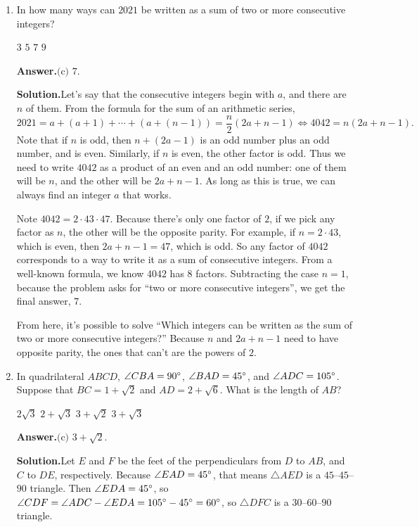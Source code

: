 \documentclass[11pt,paper=letter]{scrartcl}
\newcommand{\ansb}[2]{{\sffamily \bfseries Answer.}\;\(\boxed{\text{(#1) #2}}\).}
\newcommand{\sol}{{\sffamily \bfseries Solution.}\;}
\newenvironment{rem}%
{\noindent \ignorespaces \small \sffamily \sansmath {\bfseries Remark.}}%
{\ignorespacesafterend}
\begin{document}
\begin{enumerate}[align=left,leftmargin=*]
\item In how many ways can $2021$ be written as a sum of two or more consecutive integers?

\fourch
{$3$}
{$5$}
{$7$}
{$9$}

\ansb{c}{$7$}

\sol Let's say that the consecutive integers begin with $a$, and there are $n$ of them. From the formula for the sum of an arithmetic series, \[
  2021 = a + (a + 1) + \cdots + \left(a + (n - 1)\right) = \frac{n}{2}(2a + n - 1) \iff 4042 = n(2a + n - 1).
\]
Note that if $n$ is odd, then $n + (2a - 1)$ is an odd number plus an odd number, and is even. Similarly, if $n$ is even, the other factor is odd. Thus we need to write $4042$ as a product of an even and an odd number: one of them will be $n$, and the other will be $2a + n - 1$. As long as this is true, we can always find an integer $a$ that works.

Note $4042 = 2 \cdot 43 \cdot 47$. Because there's only one factor of $2$, if we pick any factor as $n$, the other will be the opposite parity. For example, if $n = 2 \cdot 43$, which is even, then $2a + n - 1 = 47$, which is odd. So any factor of $4042$ corresponds to a way to write it as a sum of consecutive integers. From a well-known formula, we know $4042$ has $8$ factors. Subtracting the case $n = 1$, because the problem asks for ``two or more consecutive integers'', we get the final answer, $7$.

\begin{rem}
From here, it's possible to solve ``Which integers can be written as the sum of two or more consecutive integers?'' Because $n$ and $2a + n - 1$ need to have opposite parity, the ones that can't are the powers of $2$.
\end{rem}

\item In quadrilateral $ABCD$, $\angle CBA = 90^\circ$, $\angle BAD = 45^\circ$, and $\angle ADC = 105^\circ$. Suppose that $BC = 1 + \sqrt{2}$ and $AD = 2 + \sqrt{6}$. What is the length of $AB$?

\fourch
{$2\sqrt{3}$}
{$2 + \sqrt{3}$}
{$3 + \sqrt{2}$}
{$3 + \sqrt{3}$}

\ansb{c}{$3 + \sqrt{2}$}

\sol Let $E$ and $F$ be the feet of the perpendiculars from $D$ to $AB$, and $C$ to $DE$, respectively. Because $\angle EAD = 45^\circ$, that means $\triangle AED$ is a $45$--$45$--$90$ triangle. Then $\angle EDA = 45^\circ$, so $\angle CDF = \angle ADC - \angle EDA = 105^\circ - 45^\circ = 60^\circ$, so $\triangle DFC$ is a $30$--$60$--$90$ triangle.


\end{enumerate}
\end{document}

